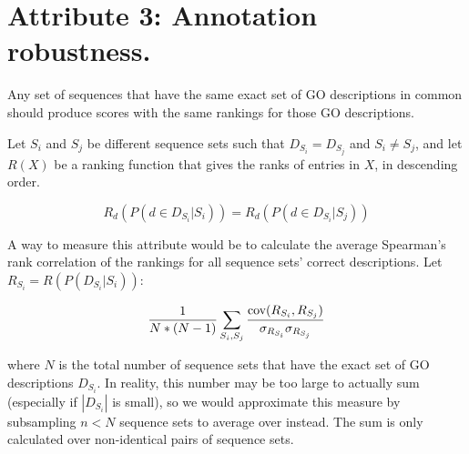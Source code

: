 \documentclass{specification}
\begin{document}


\section*{Attribute 3: Annotation robustness.}

Any set of sequences that have the same exact set of GO descriptions in common should produce scores with the same rankings for those GO descriptions.

Let $S_i$ and $S_j$ be different sequence sets such that $D_{S_i} = D_{S_j}$ and $S_i \neq S_j$, and let $R(X)$ be a ranking function that gives the ranks of entries in $X$, in descending order.

\[R_{d}(P(d \in D_{S_i} | S_i)) = R_{d}(P(d \in D_{S_i} | S_j))\]

A way to measure this attribute would be to calculate the average Spearman's rank correlation of the rankings for all sequence sets' correct descriptions. Let $R_{S_i} = R(P(D_{S_i} | S_i))$:

\[\frac{1}{N*(N-1)}\sum_{S_i, S_j} \frac{\textnormal{cov}(R_{S_i}, R_{S_j})}{\sigma_{R_{S_i}}\sigma_{R_{S_j}}}\]

where $N$ is the total number of sequence sets that have the exact set of GO descriptions $D_{S_i}$. In reality, this number may be too large to actually sum (especially if $|D_{S_i}|$ is small), so we would approximate this measure by subsampling $n < N$ sequence sets to average over instead. The sum is only calculated over non-identical pairs of sequence sets.

%
%
%
%
%
\end{document}
